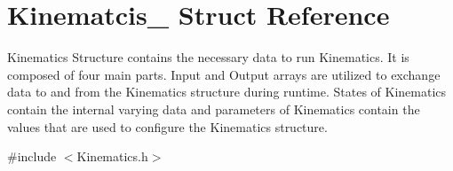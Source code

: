 \hypertarget{struct_kinematcis__}{}\section{Kinematcis\+\_\+ Struct Reference}
\label{struct_kinematcis__}


Kinematics Structure contains the necessary data to run Kinematics. It is composed of four main parts. Input and Output arrays are utilized to exchange data to and from the Kinematics structure during runtime. States of Kinematics contain the internal varying data and parameters of Kinematics contain the values that are used to configure the Kinematics structure.  




{\ttfamily \#include $<$Kinematics.\+h$>$}


